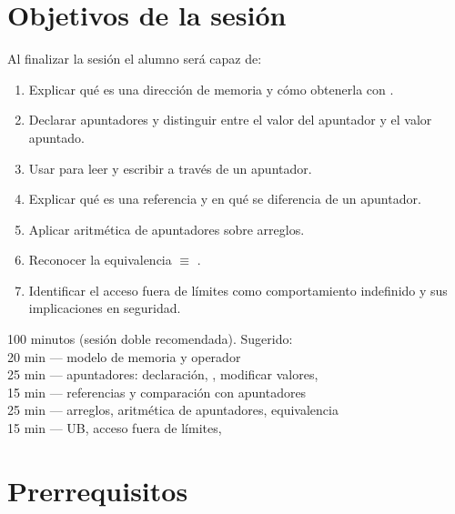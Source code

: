 \documentclass[12pt, oneside]{article}
\begin{document}

\tableofcontents
\newpage

\section{Objetivos de la sesión}

Al finalizar la sesión el alumno será capaz de:

\begin{enumerate}
  \item Explicar qué es una dirección de memoria y cómo obtenerla con \cpp{\&}.
  \item Declarar apuntadores y distinguir entre el valor del apuntador y el
        valor apuntado.
  \item Usar \cpp{*} para leer y escribir a través de un apuntador.
  \item Explicar qué es una referencia y en qué se diferencia de un apuntador.
  \item Aplicar aritmética de apuntadores sobre arreglos.
  \item Reconocer la equivalencia  $\equiv$ .
  \item Identificar el acceso fuera de límites como comportamiento indefinido
        y sus implicaciones en seguridad.
\end{enumerate}

\begin{notaprofesor}
  100 minutos (sesión doble recomendada). Sugerido:\\
  20 min — modelo de memoria y operador \cpp{\&} \\
  25 min — apuntadores: declaración, \cpp{*}, modificar valores,  \\
  15 min — referencias y comparación con apuntadores \\
  25 min — arreglos, aritmética de apuntadores, equivalencia \\
  15 min — UB, acceso fuera de límites, 
\end{notaprofesor}

\section{Prerrequisitos}
\end{document}
